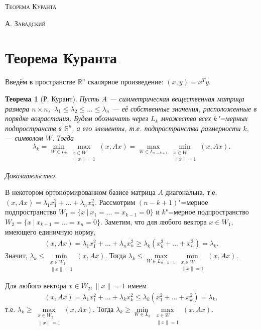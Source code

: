 \documentclass[11pt,a4paper]{article}
\begin{document}
\begin{center}
\scshape{\LARGE{Теорема Куранта}}
\vspace{1cm}

\scshape{А. Завадский}
\end{center}
\section{Теорема Куранта}

Введём в пространстве $\mathbb{R}^n$ скалярное произведение: $(x,y)=x^Ty.$

\newtheorem{theorem}{Теорема}
\begin{theorem} [Р. Курант]

Пусть $A$ --- симметрическая вещественная матрица размера $n\times n$, $~\lambda_1\leqslant\lambda_2\leqslant\ldots\leqslant\lambda_n$ --- её собственные значения, расположенные в порядке возрастания. 
Будем обозначать через $L_k$ множество всех $k$"=мерных подпространств в $\mathbb R^{n}$, а его элементы, т.е. подпространства размерности $k,$ --- символом $W$.  Тогда 
$$\lambda_k=\min_{W\in L_{k}}\max_{\substack{x\in W\\\|x\|=1}}(x,Ax)=\max_{W\in L_{n-k+1}}\min_{\substack{x\in W\\\|x\|=1}}(x,Ax).$$
\end{theorem}
\slshape Доказательство.
\upshape

В некотором ортонормированном базисе матрица $A$ диагональна, т.е. $(x,Ax)=\lambda_1x_1^2+\ldots+\lambda_nx_n^2.$ 
Рассмотрим $(n-k+1)$"=мерное подпространство $W_1=\{x~|~x_1=\ldots=x_{k-1}=0\}$ и $k$"=мерное подпространство  $W_2=\{x~|~x_{k+1}=\ldots=x_n=0\}.$
Заметим, что для любого вектора $x\in W_1,$ имеющего единичную норму, 
\begin{gather}
(x,Ax)=\lambda_1x_1^2+\ldots+\lambda_nx_n^2\geqslant\lambda_k(x_k^2+\ldots+x_n^2)=\lambda_k.\label{1}
\end{gather}
Значит, $\lambda_k\leqslant\min\limits_{\substack{x\in W_1\\\|x\|=1}}(x,Ax).$ Тогда $\lambda_k\leqslant\max\limits_{W\in L_{n-k+1}}\min\limits_{\substack{x\in W\\\|x\|=1}}(x,Ax).$

Для любого вектора $x\in W_2, \|x\|=1$ имеем
\begin{gather}
(x,Ax)=\lambda_1x_1^2+\ldots+\lambda_kx_k^2\leqslant\lambda_k(x_1^2+\ldots+x_k^2)=\lambda_k,\label{2}
\end{gather}
т.е. $\lambda_k\geqslant\max\limits_{\substack{x\in W_2\\\|x\|=1}}(x,Ax).$ Тогда $\lambda_k\geqslant\min\limits_{W\in L_{k}}\max\limits_{\substack{x\in W\\\|x\|=1}}(x,Ax).$
\end{document}

